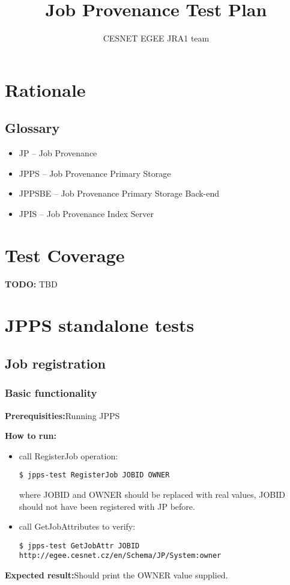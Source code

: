 \documentclass{egee}
\title{Job Provenance Test Plan}
\author{CESNET EGEE JRA1 team}
\def\req{\noindent\textbf{Prerequisities:}}
\def\how{\noindent\textbf{How to run:}}
\def\result{\noindent\textbf{Expected result:}}
\def\todo#1{\textbf{TODO:} #1}
\begin{document}

\newpage
\tableofcontents
\newpage

\section{Rationale}
\subsection{Glossary}
\begin{itemize}
\item JP -- Job Provenance
\item JPPS -- Job Provenance Primary Storage
\item JPPSBE -- Job Provenance Primary Storage Back-end
\item JPIS -- Job Provenance Index Server
\end{itemize}


\section{Test Coverage}
\todo{TBD}


\section{JPPS standalone tests}

\subsection{Job registration}

\subsubsection{Basic functionality}
\label{regjob}
\req Running JPPS

\how
\begin{itemize}
\item call RegisterJob operation:
\begin{verbatim}
$ jpps-test RegisterJob JOBID OWNER
\end{verbatim}
where JOBID and OWNER should be replaced with real values, JOBID should not have
been registered with JP before.

\item  call GetJobAttributes to verify:
\begin{verbatim}
$ jpps-test GetJobAttr JOBID http://egee.cesnet.cz/en/Schema/JP/System:owner
\end{verbatim}
\end{itemize}
\result Should print the OWNER value supplied.
\end{document}
